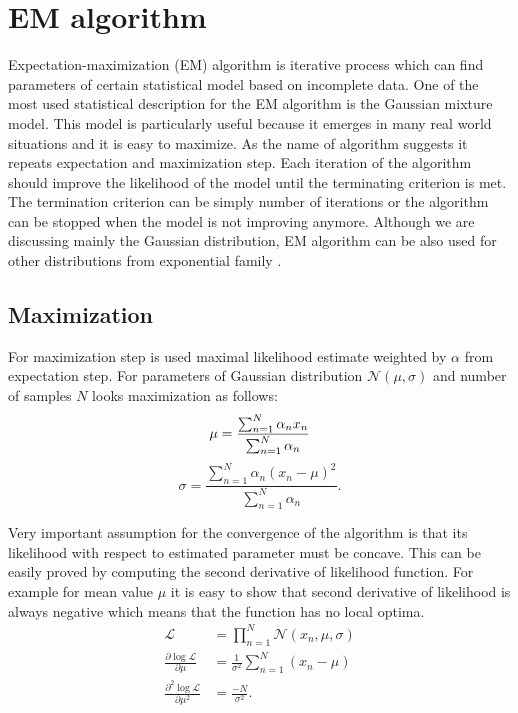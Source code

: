 \section{EM algorithm}
Expectation-maximization (EM) algorithm is iterative process which can find parameters of certain statistical model based on incomplete data. One of the most used statistical description for the EM algorithm is the Gaussian mixture model. This model is particularly useful because it emerges in many real world situations and it is easy to maximize. As the name of algorithm suggests it repeats expectation and maximization step. Each iteration of the algorithm should improve the likelihood of the model until the terminating criterion is met. The termination criterion can be simply number of iterations or the algorithm can be stopped when the model is not improving anymore. Although we are discussing mainly the Gaussian distribution, EM algorithm can be also used for other distributions from exponential family
 \cite{dempster1977}. 
 
 \subsection{Maximization}
For maximization step is used maximal likelihood estimate weighted by $\alpha$ from expectation step. For parameters of Gaussian distribution $\mathcal{N}(\mu, \sigma)$ and number of samples $N$ looks maximization as follows:
\begin{equation}
\mu = \frac{\sum_{n = 1}^{N} \alpha_n x_n}{\sum_{n = 1}^{N} \alpha_n}  \\
\end{equation}
\begin{equation}
\sigma = \frac{\sum_{n = 1}^{N}\alpha_n (x_n - \mu)^2}{\sum_{n = 1}^{N} \alpha_n} .
\end{equation}

Very important assumption for the convergence of the algorithm is that its likelihood with respect to estimated parameter must be concave. This can be easily proved by computing the second derivative of likelihood function. For example for mean value $\mu$ it is easy to show that second derivative of likelihood is always negative which means that the function has no local optima.
\begin{align}
\mathcal{L} &= \prod_{n=1}^N \mathcal{N}(x_n, \mu, \sigma) \\
\frac{\partial \log \mathcal{L}}{\partial \mu} &= \frac{1}{\sigma^2} \sum_{n = 1}^{N} (x_n - \mu) \\
\frac{\partial^2 \log \mathcal{L}}{\partial \mu^2} &= \frac{-N}{\sigma^2}.
\end{align}

